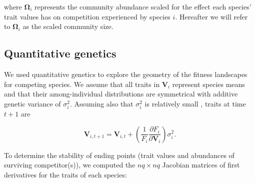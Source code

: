 \noindent where $\mathbf{\Omega}_i$ represents the community abundance scaled
for the effect each species' trait values has on competition
experienced by species $i$.
Hereafter we will refer to $\mathbf{\Omega}_i$ as the scaled community size.




%


\subsection*{Quantitative genetics}

We used quantitative genetics to explore the geometry of the fitness landscapes for
competing species.
We assume that all traits in $\mathbf{V}_i$ represent species means and that their
among-individual distributions are symmetrical with additive genetic variance
of $\sigma^2_i$.
Assuming also that $\sigma^2_i$ is relatively small
\citep{Iwasa:1991eo,Abrams:2001va,Abrams:1993cr}, traits at time $t+1$ are

\begin{equation} \label{eq:trait-change}
    \mathbf{V}_{i,t+1} = \mathbf{V}_{i,t} + \left( \frac{1}{F_i}
        \frac{\partial F_i}{\partial \mathbf{V}_{i}} \right) \sigma^2_i
    \textrm{.}
\end{equation}


To determine the stability of ending points (trait values and abundances of surviving
competitor(s)), we computed the $nq \times nq$ Jacobian matrices of first derivatives
for the traits of each species:

